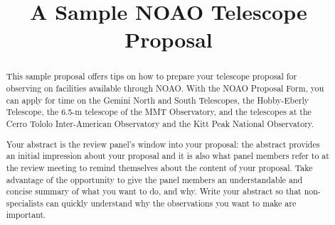 \documentclass[11pt]{article}
\begin{document}
\title{A Sample NOAO Telescope Proposal}



%


\begin{abstract}
This sample proposal offers tips on how to prepare your telescope
proposal for observing on facilities available through NOAO. 
With the NOAO Proposal Form, you can apply for time on the 
Gemini North and South Telescopes, the  Hobby-Eberly
Telescope, the 6.5-m telescope of the MMT Observatory, and the telescopes
at the Cerro Tololo Inter-American Observatory and the Kitt Peak
National Observatory.  

Your abstract is the review panel's window into your proposal: the abstract
provides an initial impression about your proposal and it is also
what panel members refer to at the review meeting to remind themselves
about the content of your proposal.  Take advantage of the opportunity
to give the panel members an understandable and concise summary of what 
you want to do, and why.  Write your abstract so that non-specialists can
quickly understand why the observations you want to make are important.

\end{abstract}


\end{document}
